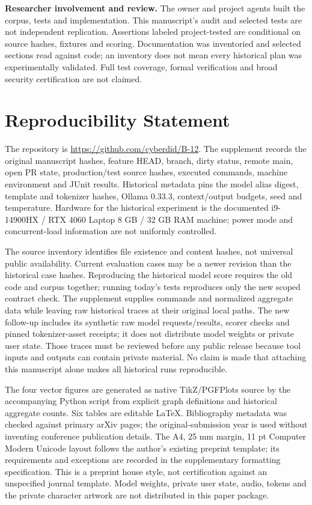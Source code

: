 \documentclass[11pt,a4paper]{article}
\begin{document}
\textbf{Researcher involvement and review.} The owner and project agents built the corpus, tests and implementation. This manuscript's audit and selected tests are not independent replication. Assertions labeled project-tested are conditional on source hashes, fixtures and scoring. Documentation was inventoried and selected sections read against code; an inventory does not mean every historical plan was experimentally validated. Full test coverage, formal verification and broad security certification are not claimed.

\section{Reproducibility Statement}\label{sec:repro}
The repository is \url{https://github.com/cyberdid/B-12}. The supplement records the original manuscript hashes, feature HEAD, branch, dirty status, remote main, open PR state, production/test source hashes, executed commands, machine environment and JUnit results. Historical metadata pins the model alias digest, template and tokenizer hashes, Ollama 0.33.3, context/output budgets, seed and temperature. Hardware for the historical experiment is the documented i9-14900HX / RTX 4060 Laptop 8 GB / 32 GB RAM machine; power mode and concurrent-load information are not uniformly controlled.

The source inventory identifies file existence and content hashes, not universal public availability. Current evaluation cases may be a newer revision than the historical case hashes. Reproducing the historical model score requires the old code and corpus together; running today's tests reproduces only the new scoped contract check. The supplement supplies commands and normalized aggregate data while leaving raw historical traces at their original local paths. The new follow-up includes its synthetic raw model requests/results, scorer checks and pinned tokenizer-asset receipts; it does not distribute model weights or private user state. Those traces must be reviewed before any public release because tool inputs and outputs can contain private material. No claim is made that attaching this manuscript alone makes all historical runs reproducible.

The four vector figures are generated as native TikZ/PGFPlots source by the accompanying Python script from explicit graph definitions and historical aggregate counts. Six tables are editable LaTeX. Bibliography metadata was checked against primary arXiv pages; the original-submission year is used without inventing conference publication details. The A4, 25 mm margin, 11 pt Computer Modern Unicode layout follows the author's existing preprint template; its requirements and exceptions are recorded in the supplementary formatting specification. This is a preprint house style, not certification against an unspecified journal template. Model weights, private user state, audio, tokens and the private character artwork are not distributed in this paper package.
\end{document}
